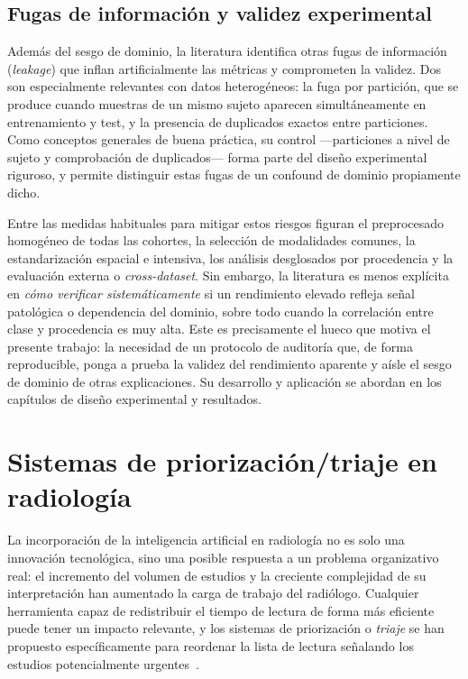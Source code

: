 \subsection{Fugas de información y validez experimental}

Además del sesgo de dominio, la literatura identifica otras fugas de información
(\emph{leakage}) que inflan artificialmente las métricas y comprometen la validez.
Dos son especialmente relevantes con datos heterogéneos: la fuga por partición,
que se produce cuando muestras de un mismo sujeto aparecen simultáneamente en
entrenamiento y test, y la presencia de duplicados exactos entre particiones.
Como conceptos generales de buena práctica, su control ---particiones a nivel de
sujeto y comprobación de duplicados--- forma parte del diseño experimental
riguroso, y permite distinguir estas fugas de un confound de dominio propiamente
dicho.

Entre las medidas habituales para mitigar estos riesgos figuran el preprocesado
homogéneo de todas las cohortes, la selección de modalidades comunes, la
estandarización espacial e intensiva, los análisis desglosados por procedencia y
la evaluación externa o \emph{cross-dataset}. Sin embargo, la literatura es menos
explícita en \emph{cómo verificar sistemáticamente} si un rendimiento elevado
refleja señal patológica o dependencia del dominio, sobre todo cuando la
correlación entre clase y procedencia es muy alta. Este es precisamente el hueco
que motiva el presente trabajo: la necesidad de un protocolo de auditoría que, de
forma reproducible, ponga a prueba la validez del rendimiento aparente y aísle el
sesgo de dominio de otras explicaciones. Su desarrollo y aplicación se abordan en
los capítulos de diseño experimental y resultados.

\section{Sistemas de priorización/triaje en radiología}
\label{sec:triaje}

La incorporación de la inteligencia artificial en radiología no es solo una
innovación tecnológica, sino una posible respuesta a un problema organizativo
real: el incremento del volumen de estudios y la creciente complejidad de su
interpretación han aumentado la carga de trabajo del radiólogo. Cualquier
herramienta capaz de redistribuir el tiempo de lectura de forma más eficiente
puede tener un impacto relevante, y los sistemas de priorización o \emph{triaje}
se han propuesto específicamente para reordenar la lista de lectura señalando los
estudios potencialmente urgentes~\cite{titano2018cranial}.

